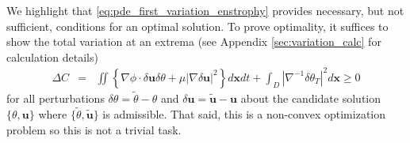 We highlight that \ref{eq:pde_first_variation_enstrophy} provides necessary, but not sufficient, conditions for an optimal solution. To prove optimality, it suffices to show the total variation at an extrema (see Appendix \ref{sec:variation_calc} for calculation details)
  \begin{eqnarray}
  	\label{eq:total_Variation}
 	\Delta C&=& \iint \left\{\nabla\phi\cdot\delta\mathbf{u}\delta \theta 
			 +\mu |\nabla\delta \mathbf{u}|^{2}  
  		\right\}d\mathbf{x}dt +\int_{D}
  			|\nabla^{-1} 
			\delta\theta_{T}|^{2}
	      d\mathbf{x} \geq 0
\end{eqnarray}
%
for all perturbations $\delta\theta = \tilde{\theta}-\theta$ and $\delta \mathbf{u} = \tilde{\mathbf{u}}-\mathbf{u}$ about the candidate solution $\{\theta,\mathbf{u}\}$ where $\{\tilde{\theta},\tilde{\mathbf{u}}\}$ is admissible. That said, this is a non-convex optimization problem so this is not a trivial task.


